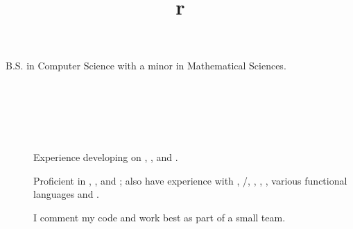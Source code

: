 B.S. in Computer Science with a minor in Mathematical Sciences.


\begin{formatb}
\title{r}\\
\\
\body\\
\end{formatb}

%

\section{}
\begin{description}
\item[]
Experience developing on , ,  and .
\item[]
Proficient in , ,  and \kw{\Cplusplus};
also have experience with , /,
, , , various functional languages and .
\item[]
I comment my code and work best as part of a small team.

\end{description}

\section{}

